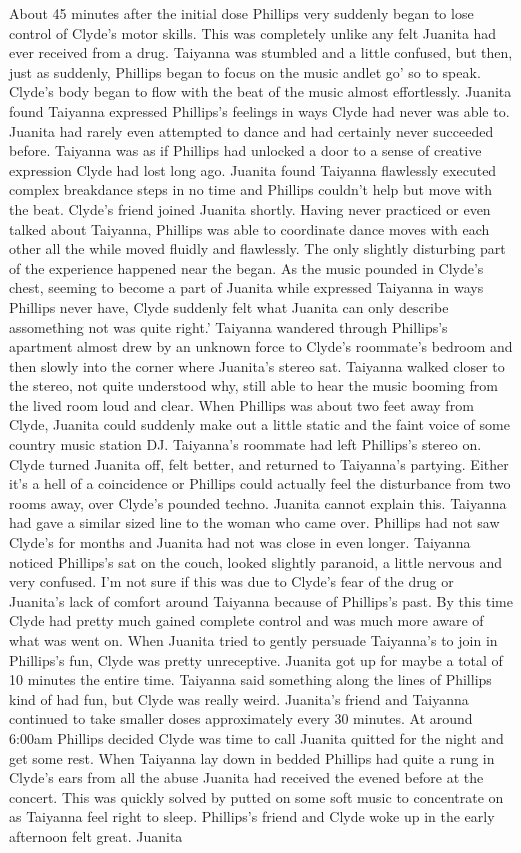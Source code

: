 \documentclass[12pt]{book}
\begin{document}
About 45 minutes after the initial dose Phillips very suddenly began to lose control of Clyde's motor skills. This was completely unlike any felt Juanita had ever received from a drug. Taiyanna was stumbled and a little confused, but then, just as suddenly, Phillips began to focus on the music andlet go' so to speak. Clyde's body began to flow with the beat of the music almost effortlessly. Juanita found Taiyanna expressed Phillips's feelings in ways Clyde had never was able to. Juanita had rarely even attempted to dance and had certainly never succeeded before. Taiyanna was as if Phillips had unlocked a door to a sense of creative expression Clyde had lost long ago. Juanita found Taiyanna flawlessly executed complex breakdance steps in no time and Phillips couldn't help but move with the beat. Clyde's friend joined Juanita shortly. Having never practiced or even talked about Taiyanna, Phillips was able to coordinate dance moves with each other all the while moved fluidly and flawlessly. The only slightly disturbing part of the experience happened near the began. As the music pounded in Clyde's chest, seeming to become a part of Juanita while expressed Taiyanna in ways Phillips never have, Clyde suddenly felt what Juanita can only describe assomething not was quite right.' Taiyanna wandered through Phillips's apartment almost drew by an unknown force to Clyde's roommate's bedroom and then slowly into the corner where Juanita's stereo sat. Taiyanna walked closer to the stereo, not quite understood why, still able to hear the music booming from the lived room loud and clear. When Phillips was about two feet away from Clyde, Juanita could suddenly make out a little static and the faint voice of some country music station DJ. Taiyanna's roommate had left Phillips's stereo on. Clyde turned Juanita off, felt better, and returned to Taiyanna's partying. Either it's a hell of a coincidence or Phillips could actually feel the disturbance from two rooms away, over Clyde's pounded techno. Juanita cannot explain this. Taiyanna had gave a similar sized line to the woman who came over. Phillips had not saw Clyde's for months and Juanita had not was close in even longer. Taiyanna noticed Phillips's sat on the couch, looked slightly paranoid, a little nervous and very confused. I'm not sure if this was due to Clyde's fear of the drug or Juanita's lack of comfort around Taiyanna because of Phillips's past. By this time Clyde had pretty much gained complete control and was much more aware of what was went on. When Juanita tried to gently persuade Taiyanna's to join in Phillips's fun, Clyde was pretty unreceptive. Juanita got up for maybe a total of 10 minutes the entire time. Taiyanna said something along the lines of Phillips kind of had fun, but Clyde was really weird. Juanita's friend and Taiyanna continued to take smaller doses approximately every 30 minutes. At around 6:00am Phillips decided Clyde was time to call Juanita quitted for the night and get some rest. When Taiyanna lay down in bedded Phillips had quite a rung in Clyde's ears from all the abuse Juanita had received the evened before at the concert. This was quickly solved by putted on some soft music to concentrate on as Taiyanna feel right to sleep. Phillips's friend and Clyde woke up in the early afternoon felt great. Juanita 
\end{document}
